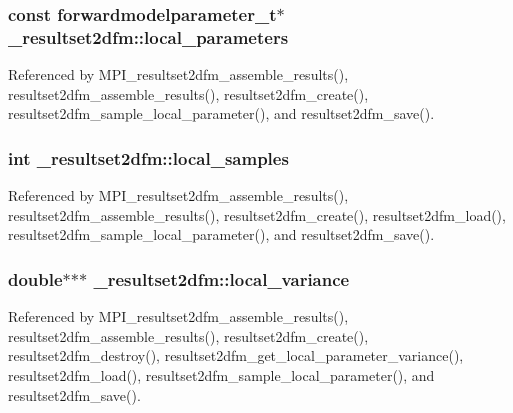 \subsubsection[{\texorpdfstring{local\+\_\+parameters}{local_parameters}}]{\setlength{\rightskip}{0pt plus 5cm}const {\bf forwardmodelparameter\+\_\+t}$\ast$ \+\_\+resultset2dfm\+::local\+\_\+parameters}\hypertarget{struct__resultset2dfm_a159adca19c1c6e9f85ea83590113a802}{}\label{struct__resultset2dfm_a159adca19c1c6e9f85ea83590113a802}


Referenced by M\+P\+I\+\_\+resultset2dfm\+\_\+assemble\+\_\+results(), resultset2dfm\+\_\+assemble\+\_\+results(), resultset2dfm\+\_\+create(), resultset2dfm\+\_\+sample\+\_\+local\+\_\+parameter(), and resultset2dfm\+\_\+save().

\subsubsection[{\texorpdfstring{local\+\_\+samples}{local_samples}}]{\setlength{\rightskip}{0pt plus 5cm}int \+\_\+resultset2dfm\+::local\+\_\+samples}\hypertarget{struct__resultset2dfm_a45f582addfb36964f8ded22f36945e3a}{}\label{struct__resultset2dfm_a45f582addfb36964f8ded22f36945e3a}


Referenced by M\+P\+I\+\_\+resultset2dfm\+\_\+assemble\+\_\+results(), resultset2dfm\+\_\+assemble\+\_\+results(), resultset2dfm\+\_\+create(), resultset2dfm\+\_\+load(), resultset2dfm\+\_\+sample\+\_\+local\+\_\+parameter(), and resultset2dfm\+\_\+save().

\subsubsection[{\texorpdfstring{local\+\_\+variance}{local_variance}}]{\setlength{\rightskip}{0pt plus 5cm}double$\ast$$\ast$$\ast$ \+\_\+resultset2dfm\+::local\+\_\+variance}\hypertarget{struct__resultset2dfm_aebba0491d271c5566885d8c303c54a1c}{}\label{struct__resultset2dfm_aebba0491d271c5566885d8c303c54a1c}


Referenced by M\+P\+I\+\_\+resultset2dfm\+\_\+assemble\+\_\+results(), resultset2dfm\+\_\+assemble\+\_\+results(), resultset2dfm\+\_\+create(), resultset2dfm\+\_\+destroy(), resultset2dfm\+\_\+get\+\_\+local\+\_\+parameter\+\_\+variance(), resultset2dfm\+\_\+load(), resultset2dfm\+\_\+sample\+\_\+local\+\_\+parameter(), and resultset2dfm\+\_\+save().

